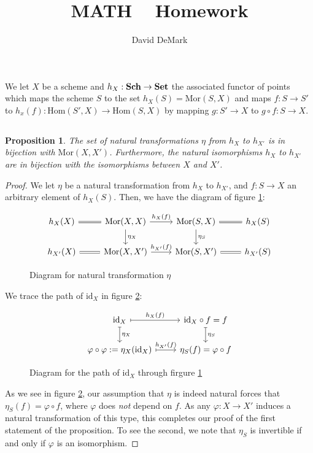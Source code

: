 \documentclass[english,letter,doublesided]{article}
\title{MATH \course~ Homework \Roman{hwn}}
\author{David DeMark}
\date{\due}
\newcommand{\mor}{\mathrm{Mor}}
\newcommand{\prob}[1]{\setcounter{section}{#1-1}\section{}}
\newcommand{\prt}[1]{\setcounter{subsection}{#1-1}\subsection{}}
\newtheorem*{prop*}{Proposition}
\theoremstyle{remark}
\theoremstyle{definition}
\renewcommand{\hom}{\mathrm{Hom}}
\newcommand{\id}{\mathrm{id} }
\newcommand{\cat}[1]{{\mathrm{\bf{#1}}}}
\newcommand{\gph}{\varphi}
\begin{document}
\maketitle

\prob{1} We let $X$ be a scheme and $h_X:\cat{Sch}\to \cat{Set}$ the associated functor of points which maps the scheme $S$ to the set $h_X(S)=\mor(S,X)$ and maps $f:S\to S'$ to $h_x(f):\hom(S',X)\to \hom(S,X)$ by mapping $g:S'\to X$ to $g\circ f:S\to X$. 
\prt{1}
\begin{prop*}
	The set of natural transformations $\eta$ from $h_X$ to $ h_{X'}$ is in bijection with $\mor(X,X') $. Furthermore, the natural isomorphisms $h_X$ to $h_{X'}$ are in bijection with the isomorphisms between $X$ and $X'$.
\end{prop*}
\begin{proof}
We let $\eta$ be a natural transformation from $h_X$ to $h_{X'}$, and $f:S\to X$ an arbitrary element of $h_X(S)$. Then, we have the diagram of figure \ref{ntdiag}:
\begin{figure}[h!]
	$$\begin{tikzcd}
	h_X(X)\arrow[r,equal]&\mor(X,X)\arrow[r,"h_X(f)"]\arrow[d,"\eta_{X}"]&\mor(S,X)\arrow[d,"\eta_S"]\arrow[r,equal]&h_X(S)\\
	h_{X'}(X)\arrow[r,equal]&\mor(X,X')\arrow[r,"h_{X'}(f)"]&\mor(S,X')\arrow[r,equal]&h_{X'}(S)
	\end{tikzcd}$$\caption{Diagram for natural transformation $\eta$\label{ntdiag}}
\end{figure}
We trace the path of $\id_X$ in figure \ref{ntelt}:
\begin{figure}[h!]
	$$\begin{tikzcd}
\id_X\arrow[r,"h_X(f)",mapsto]\arrow[d,"\eta_{X}",mapsto]&\id_X\circ f=f\arrow[d,"\eta_S",mapsto]\\
\gph\circ \gph:=\eta_X(\id_X) \arrow[r,"h_{X'}(f)",mapsto]&\eta_S(f)=\gph \circ f
	\end{tikzcd}$$\caption{Diagram for the path of $\id_X$ through firgure \ref{ntdiag}\label{ntelt}}
\end{figure}
As we see in figure \ref{ntelt}, our assumption that $\eta$ is indeed natural forces that $\eta_S(f)=\gph \circ f$, where $\gph$ does \textit{not} depend on $f$. As any $\gph:X\to X'$ induces a natural transformation of this type, this completes our proof of the first statement of the proposition. To see the second, we note that $\eta_S$ is invertible if and only if $\gph$ is an isomorphism.
\end{proof}
\end{document}
